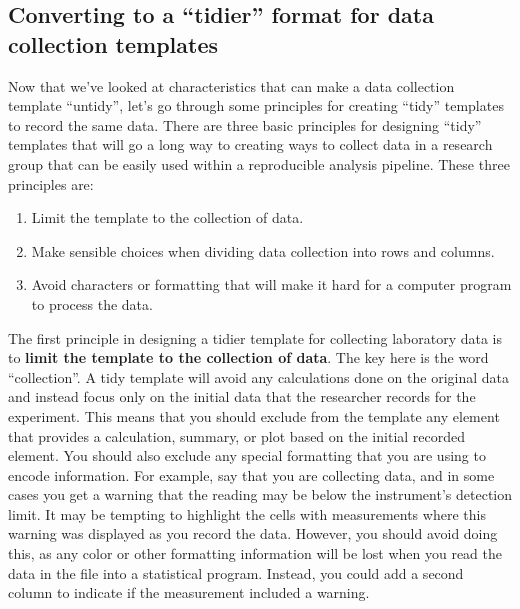 \documentclass[]{tufte-book}
\providecommand{\tightlist}{%
  \setlength{\itemsep}{0pt}\setlength{\parskip}{0pt}}
\begin{document}
\hypertarget{converting-to-a-tidier-format-for-data-collection-templates}{%
\subsection{Converting to a ``tidier'' format for data collection templates}\label{converting-to-a-tidier-format-for-data-collection-templates}}

Now that we've looked at characteristics that can make a data collection template ``untidy'', let's
go through some principles for creating ``tidy'' templates to record the same data. There are three
basic principles for designing ``tidy'' templates that will go a long way to creating ways to
collect data in a research group that can be easily used within a reproducible analysis pipeline.
These three principles are:

\begin{enumerate}
\def\labelenumi{\arabic{enumi}.}
\tightlist
\item
  Limit the template to the collection of data.
\item
  Make sensible choices when dividing data collection into rows and columns.
\item
  Avoid characters or formatting that will make it hard for a computer program to process the data.
\end{enumerate}

The first principle in designing a tidier template for collecting laboratory
data is to \textbf{limit the template to the collection of data}. The key here is the
word ``collection''. A tidy template will avoid any calculations done on the
original data and instead focus only on the initial data that the researcher
records for the experiment. This means that you should exclude from the template
any element that provides a calculation, summary, or plot based on the initial
recorded element. You should also exclude any special formatting that you are using
to encode information. For example, say that you are collecting data, and in some
cases you get a warning that the reading may be below the instrument's detection
limit. It may be tempting to highlight the cells with measurements where this warning
was displayed as you record the data. However, you should avoid doing this, as any
color or other formatting information will be lost when you read the data in the
file into a statistical program. Instead, you could add a second column to indicate
if the measurement included a warning.
\end{document}
